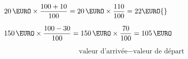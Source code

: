 \documentclass["../Cours.tex"]{subfiles}
\begin{document}


\begin{listedexemples}
    \item {} $\qty{20}{\EURO} \times \dfrac{100 + 10}{100} = \qty{20}{\EURO} \times \dfrac{110}{100} = 22 \EURO{}$
    \item {} $\qty{150}{\EURO} \times \dfrac{100 - 30}{100} = \qty{150}{\EURO} \times \dfrac{70}{100} = \qty{105}{\EURO} $
\end{listedexemples}


$$ \mbox{valeur d'arrivée} - \mbox{valeur de départ} $$


\newcommand{\frandom}{\directlua{
    local a = math.random(1,20)
    local b = math.random(1,20)
    local c = math.random(1,20)
    local d = math.random(1,20)
    tex.print("\\dfrac{" .. a .. "}{" .. b .. "} + \\dfrac{" .. c .. "}{" .. d .. "} = ")
}}

\newcommand{\trandom}{\directlua{
    local a = math.random(1,20)
    local b = math.random(1,20)
    local c = a * math.random(1,9)
    tex.print("\\dfrac{" .. a .. "}{" .. b .. "} = \\dfrac{" .. c .. "}{" .. "...}")
}}

\renewcommand{\labelitemi}{$\circ$}
\end{document}
